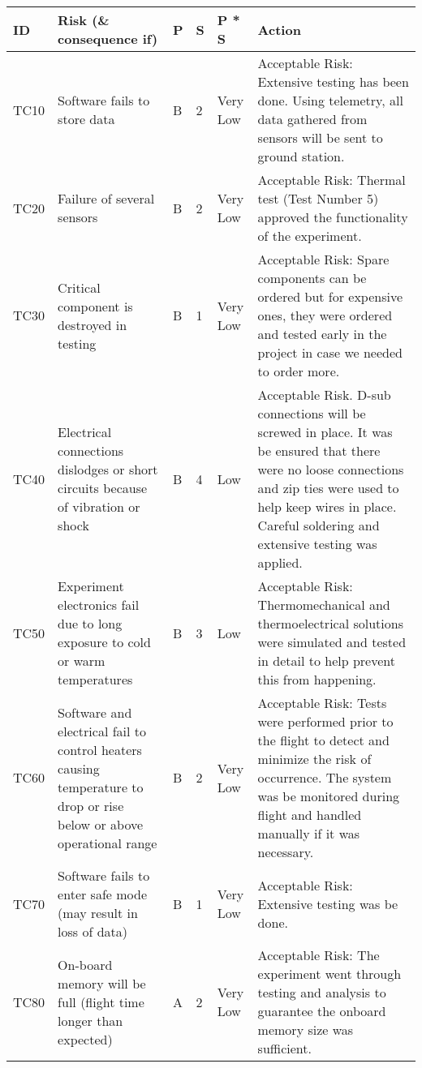


\begin{longtable}{|m{}| m{} |m{} |m{}|m{}| m{}|}

\hline
\textbf{ID} & \textbf{Risk (\& consequence if)} & \textbf{P} & \textbf{S} & \textbf{P * S} & \textbf{Action} \\ \hline
TC10 & Software fails to store data & B & 2 & \cellcolor[HTML]{34FF34}Very Low & Acceptable Risk: Extensive testing has been done. Using telemetry, all data gathered from sensors will be sent to ground station. \\ \hline
TC20 & Failure of several sensors & B & 2 & \cellcolor[HTML]{34FF34}Very Low & Acceptable Risk: Thermal test (Test Number 5) approved the functionality of the experiment. \\ \hline
TC30 & Critical component is destroyed in testing & B & 1 & \cellcolor[HTML]{34FF34}Very Low & Acceptable Risk: Spare components can be ordered but for expensive ones, they were ordered and tested early in the project in case we needed to order more. \\ \hline
TC40 & Electrical connections dislodges or short circuits because of vibration or shock & B & 4 & \cellcolor[HTML]{FCFF2F}Low & Acceptable Risk. D-sub connections will be screwed in place. It was be ensured that there were no loose connections and zip ties were used to help keep wires in place. Careful soldering and extensive testing was applied. \\ \hline
TC50 & Experiment electronics fail due to long exposure to cold or warm temperatures & B & 3 & \cellcolor[HTML]{FCFF2F}Low & Acceptable Risk: Thermomechanical and thermoelectrical solutions were simulated and tested in detail to help prevent this from happening. \\ \hline
TC60 & Software and electrical fail to control heaters causing temperature to drop or rise below or above operational range & B & 2 & \cellcolor[HTML]{34FF34}Very Low & Acceptable Risk: Tests were performed prior to the flight to detect and minimize the risk of occurrence. The system was be monitored during flight and handled manually if it was necessary. \\ \hline
TC70 & Software fails to enter safe mode (may result in loss of data) & B & 1 & \cellcolor[HTML]{34FF34}Very Low & Acceptable Risk: Extensive testing was be done. \\ \hline
TC80 & On-board memory will be full (flight time longer than expected) & A & 2 & \cellcolor[HTML]{34FF34}Very Low & Acceptable Risk: The experiment went through testing and analysis to guarantee the onboard memory size was sufficient.\\ \hline

\end{longtable}
